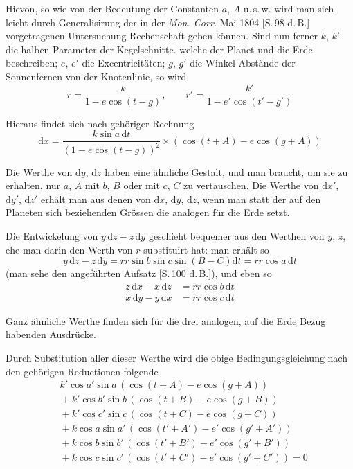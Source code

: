 Hievon, so wie von der Bedeutung der Constanten $a$, $A$ u.\,s.\,w. wird man
sich leicht durch Generalisirung der in der \textit{Mon. Corr.} Mai 1804 [S.\,98 d.\,B.]
vorgetragenen Untersuchung Rechenschaft geben können. Sind nun ferner $k$, $k'$
%
die halben Parameter der Kegelschnitte. welche der Planet und die Erde beschreiben;
$e$, $e'$ die Excentricitäten; $g$, $g'$ die Winkel-Abstände der Sonnenfernen
von der Knotenlinie, so wird
\[
r=\frac{k}{1-e\cos(t-g)},\qquad r'=\frac{k'}{1-e'\cos(t'-g')}
\]

Hieraus findet sich nach gehöriger Rechnung
\[
\mathrm{d}x=\frac{k\sin a\,\mathrm{d}t}{(1-e\cos(t-g))^2}\times(\cos(t+A)-e\cos(g+A))
\]

Die Werthe von $\mathrm{d}y$, $\mathrm{d}z$ haben eine ähnliche Gestalt, und man braucht,
um sie zu erhalten, nur $a$, $A$ mit $b$, $B$ oder mit $c$, $C$ zu vertauschen. Die
Werthe von $\mathrm{d}x'$, $\mathrm{d}y'$, $\mathrm{d}z'$ erhält man aus denen von $\mathrm{d}x$, $\mathrm{d}y$, $\mathrm{d}z$, wenn man statt
der auf den Planeten sich beziehenden Grössen die analogen für die Erde setzt.

Die Entwickelung von $y\,\mathrm{d}z-z\,\mathrm{d}y$ geschieht bequemer aus den Werthen
von $y$, $z$, ehe man darin den Werth von $r$ substituirt hat: man erhält so
\[
y\,\mathrm{d}z-z\,\mathrm{d}y=rr\sin b\sin c\sin(B-C)\mathrm{d}t=rr\cos a\,\mathrm{d}t
\]
(man sehe den angeführten Aufsatz [S.\,100 d.\,B.]), und eben so
\[
\begin{aligned}
z\,\mathrm{d}x-x\,\mathrm{d}z&=rr\cos b\,\mathrm{d}t\\
x\,\mathrm{d}y-y\,\mathrm{d}x&=rr\cos c\,\mathrm{d}t
\end{aligned}
\]

Ganz ähnliche Werthe finden sich für die drei analogen, auf die Erde Bezug habenden
Ausdrücke.

Durch Substitution aller dieser Werthe wird die obige Bedingungsgleichung
nach den gehörigen Reductionen folgende
\[
\begin{aligned}
&k'\cos a'\sin a\,(\cos(t+A)-e\cos(g+A))\\
&{}+k'\cos b'\sin b\,(\cos(t+B)-e\cos(g+B))\\
&{}+k'\cos c'\sin c\,(\cos(t+C)-e\cos(g+C))\\
&{}+k\cos a\sin a'\,(\cos(t'+A')-e'\cos(g'+A'))\\
&{}+k\cos b\sin b'\,(\cos(t'+B')-e'\cos(g'+B'))\\
&{}+k\cos c\sin c'\,(\cos(t'+C')-e'\cos(g'+C'))=0
\end{aligned}
\]

